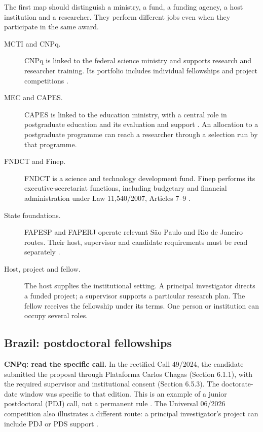 The first map should distinguish a ministry,
a fund,
a funding agency, a host institution and a
researcher.
They perform different jobs even when they
participate
in the same award.

\begin{description}
\item[MCTI and CNPq.]
CNPq is linked to the federal science
ministry and
supports research and researcher training.
Its portfolio includes individual fellowships
and
project competitions \cite{gsf-cnpq}.
\item[MEC and CAPES.]
CAPES is linked to the education ministry,
with a
central role in postgraduate education and
its
evaluation and support \cite{gsf-capes}.
An allocation to a postgraduate programme can
reach
a researcher through a selection run by that
programme.
\item[FNDCT and Finep.]
FNDCT is a science and technology development
fund.
Finep performs its executive-secretariat
functions,
including budgetary and financial
administration
under Law 11,540/2007, Articles 7--9
\cite{gsf-fndct}.
\item[State foundations.]
FAPESP and FAPERJ operate relevant São Paulo
and
Rio de Janeiro routes. Their host, supervisor
and
candidate requirements must be read
separately
\cite{gsf-fapesp-pd,gsf-faperj-pdr10}.
\item[Host, project and fellow.]
The host supplies the institutional setting.
A principal investigator directs a funded
project;
a supervisor supports a particular research
plan.
The fellow receives the fellowship under its
terms.
One person or institution can occupy several
roles.
\end{description}

\subsection{Brazil: postdoctoral fellowships}
\label{section-gsf-brazil-routes}

\textbf{CNPq: read the specific call.}
In the rectified Call 49/2024, the candidate
submitted
the proposal through Plataforma Carlos Chagas
(Section 6.1.1), with the required supervisor
and
institutional consent (Section 6.5.3).
The doctorate-date window was specific to
that edition.
This is an example of a junior postdoctoral
(PDJ) call, not a permanent rule
\cite{gsf-cnpq-pdj}.
The Universal 06/2026 competition also
illustrates a
different route: a principal investigator's
project can
include PDJ or PDS support
\cite{gsf-cnpq-universal2026}.

